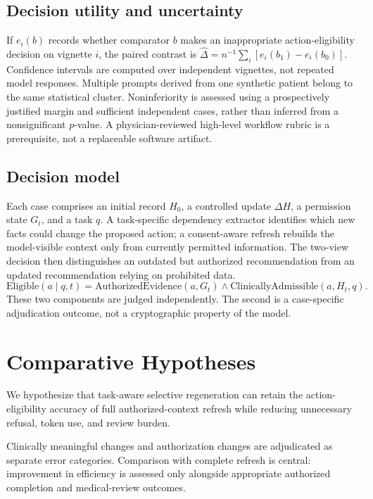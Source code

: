 \documentclass[11pt,a4paper]{article}
\begin{document}
\subsection{Decision utility and uncertainty}
If $e_i(b)$ records whether comparator $b$ makes an inappropriate action-eligibility decision on vignette $i$, the paired contrast is $\widehat{\Delta}=n^{-1}\sum_i[e_i(b_1)-e_i(b_0)]$. Confidence intervals are computed over independent vignettes, not repeated model responses. Multiple prompts derived from one synthetic patient belong to the same statistical cluster. Noninferiority is assessed using a prospectively justified margin and sufficient independent cases, rather than inferred from a nonsignificant $p$-value. A physician-reviewed high-level workflow rubric is a prerequisite, not a replaceable software artifact.


\subsection{Decision model}
Each case comprises an initial record $H_0$, a controlled update $\Delta H$, a permission state $G_t$, and a task $q$. A task-specific dependency extractor identifies which new facts could change the proposed action; a consent-aware refresh rebuilds the model-visible context only from currently permitted information. The two-view decision then distinguishes an outdated but authorized recommendation from an updated recommendation relying on prohibited data.
\begin{equation}
\mathrm{Eligible}(a\mid q,t)=\mathrm{AuthorizedEvidence}(a,G_t)
\land\mathrm{ClinicallyAdmissible}(a,H_t,q).
\end{equation}
These two components are judged independently. The second is a case-specific adjudication outcome, not a cryptographic property of the model.

\section{Comparative Hypotheses}
We hypothesize that task-aware selective regeneration can retain the action-eligibility accuracy of full authorized-context refresh while reducing unnecessary refusal, token use, and review burden.

Clinically meaningful changes and authorization changes are adjudicated as separate error categories. Comparison with complete refresh is central: improvement in efficiency is assessed only alongside appropriate authorized completion and medical-review outcomes.
\end{document}
